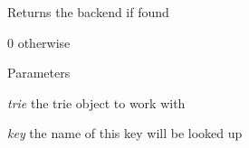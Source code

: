 \begin{DoxyReturn}{Returns}
the backend if found 

0 otherwise 
\end{DoxyReturn}

\begin{DoxyParams}{Parameters}
\item[{\em trie}]the trie object to work with \item[{\em key}]the name of this key will be looked up \end{DoxyParams}
